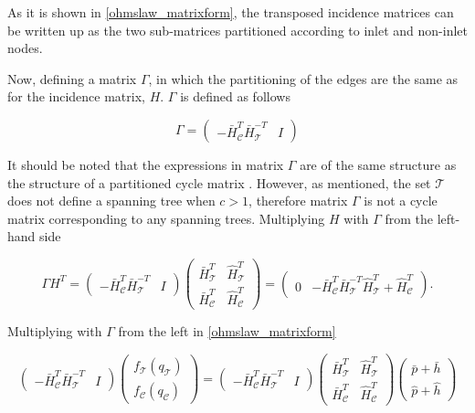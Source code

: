 As it is shown in \eqref{ohmslaw_matrixform}, the transposed incidence matrices can be written up as the two sub-matrices partitioned according to inlet and non-inlet nodes. 

Now, defining a matrix $\Gamma$, in which the partitioning of the edges are the same as for the incidence matrix, $H$. $\Gamma$ is defined as follows

\begin{equation}
\label{bmatrix}
\Gamma
 =
\begin{pmatrix} 
-\bar{H}^T_{\mathcal{C}}\bar{H}^{-T}_{\mathcal{T}} & I 
\end{pmatrix}
\end{equation}

It should be noted that the expressions in matrix $\Gamma$ are of the same structure as the structure of a partitioned cycle matrix \cite{deo2017graph}. However, as mentioned, the set $\mathcal{T}$ does not define a spanning tree when $c>1$, therefore matrix $\Gamma$ is not a cycle matrix corresponding to any spanning trees. Multiplying $H$ with $\Gamma$ from the left-hand side

 \begin{equation}
  \label{meshlaw_analogy}
  \Gamma H^T = 
  \begin{pmatrix} 
-\bar{H}^T_{\mathcal{C}}\bar{H}^{-T}_{\mathcal{T}} & I 
\end{pmatrix}
\begin{pmatrix}
   \bar{H}^T_{\mathcal{T}} & \hat{H}^T_{\mathcal{T}} \\[3pt]
   \bar{H}^T_{\mathcal{C}} & \hat{H}^T_{\mathcal{C}} 
   \end{pmatrix} 
   =
   \begin{pmatrix} 
0 & -\bar{H}^T_{\mathcal{C}}\bar{H}^{-T}_{\mathcal{T}}\hat{H}^T_{\mathcal{T}} + \hat{H}^T_{\mathcal{C}} 
\end{pmatrix}
.
\end{equation}

Multiplying with $\Gamma$ from the left in \eqref{ohmslaw_matrixform} 

\begin{equation}
\label{ohmslaw_matrixform_B}
\begin{pmatrix} 
-\bar{H}^T_{\mathcal{C}}\bar{H}^{-T}_{\mathcal{T}} & I 
\end{pmatrix}
 \begin{pmatrix} 
 f_{\mathcal{T}}(q_\mathcal{T}) \\[3pt] 
 f_{\mathcal{C}}(q_\mathcal{C}) 
 \end{pmatrix}
 =
 \begin{pmatrix} 
-\bar{H}^T_{\mathcal{C}}\bar{H}^{-T}_{\mathcal{T}} & I 
\end{pmatrix}
  \begin{pmatrix}
   \bar{H}^T_{\mathcal{T}} & \hat{H}^T_{\mathcal{T}} \\[3pt]
   \bar{H}^T_{\mathcal{C}} & \hat{H}^T_{\mathcal{C}} 
   \end{pmatrix}
   \begin{pmatrix} 
 \bar{p} + \bar{h} \\[3pt]
 \hat{p} + \hat{h} 
 \end{pmatrix}
\end{equation}

